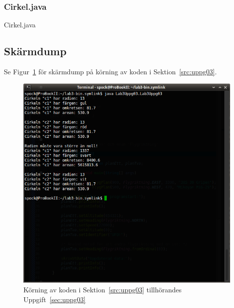 \subsubsection{Cirkel.java}
\caption{Cirkel.java}
\label{src:cirkel}


\subsection{Skärmdump}
Se Figur~\ref{fig:uppg03-screenshot} för skärmdump på körning av koden i
Sektion~\ref{src:uppg03}.

\begin{figure}[htbp]
    \centering
        \includegraphics[width=\linewidth]{img/03.png}
        \caption{Körning av koden i Sektion~\ref{src:uppg03} tillhörandes Uppgift~\ref{sec:uppg03}}
    \label{fig:uppg03-screenshot}
\end{figure}

